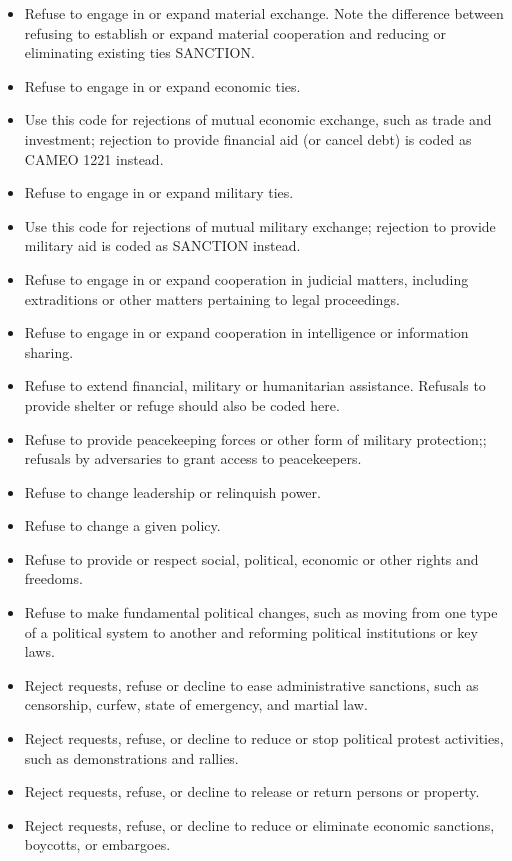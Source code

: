 \documentclass[11pt]{report}
\newcommand{\plcat}[1]{\textsf{#1}}
\begin{document}
\begin{itemize}

\item Refuse to engage in or expand material exchange. Note the difference between refusing to establish or expand material cooperation and reducing or eliminating existing ties \plcat{SANCTION}.
\item Refuse to engage in or expand economic ties.
\item Use this code for rejections of mutual economic exchange, such as trade and investment; rejection to provide financial aid (or cancel debt) is coded as CAMEO 1221 instead.
\item Refuse to engage in or expand military ties.
\item Use this code for rejections of mutual military exchange; rejection to provide military aid is coded as \plcat{SANCTION} instead.
\item Refuse to engage in or expand cooperation in judicial matters, including  extraditions or other matters pertaining to legal proceedings.
\item Refuse to engage in or expand cooperation in intelligence or information sharing.
\item Refuse to extend financial, military or humanitarian assistance. Refusals to provide shelter or refuge should also be coded here. 
\item Refuse to provide peacekeeping forces or other form of military protection;; refusals by adversaries to grant access to peacekeepers.
\item Refuse to change leadership or relinquish power.
\item Refuse to change a given policy.
\item Refuse to provide or respect social, political, economic or other rights and freedoms.
\item Refuse to make fundamental political changes, such as moving from one type of a political system to another and reforming political institutions or key laws.
\item Reject requests, refuse or decline to ease administrative sanctions, such as censorship, curfew, state of emergency, and martial law.
\item Reject requests, refuse, or decline to reduce or stop political protest activities, such as demonstrations and rallies.
\item Reject requests, refuse, or decline to release or return persons or property.
\item Reject requests, refuse, or decline to reduce or eliminate economic sanctions, boycotts, or embargoes.

\end{itemize}
\end{document}

